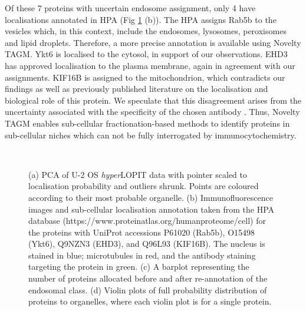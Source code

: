 \documentclass[12pt,english]{article}
\begin{document}
Of these 7 proteins with uncertain endosome assignment, only 4 have localisations annotated in HPA (Fig \ref{figure:u2os} (b)). The HPA assigns Rab5b to the vesicles  which, in this context, include the endosomes, lysosomes, peroxisomes and lipid droplets. Therefore, a more precise annotation is available using Novelty TAGM. Ykt6 is localised to the cytosol, in support of our observations. EHD3 has approved localisation to the plasma membrane, again in agreement with our assignments. KIF16B is assigned to the mitochondrion, which contradicts our findings as well as previously published literature on the localisation and biological role of this protein. We speculate that this disagreement arises from the uncertainty associated with the specificity of the chosen antibody \citep{Thul:2017}. Thus, Novelty TAGM enables sub-cellular fractionation-based methods to identify proteins in sub-cellular niches which can not be fully interrogated by immunocytochemistry.

\begin{figure}[h]
	\begin{subfigure}[t]{0.3\textwidth}
		\centering
		\caption{}
	\end{subfigure}
	\begin{subfigure}[t]{0.3\textwidth}
	\centering
	\caption{}
	\end{subfigure}
	\begin{subfigure}[t]{0.3\textwidth}
	\centering
	\caption{}
	\end{subfigure}
	~
	\begin{subfigure}[t]{1\textwidth}
		\centering
		\caption{}
	\end{subfigure}
	\caption{(a) PCA of U-2 OS \textit{hyper}LOPIT data with pointer scaled to localisation probability and outliers shrunk. Points are coloured according to their most probable organelle. (b) Immunofluorescence images and sub-cellular localisation annotation taken from the HPA database (https://www.proteinatlas.org/humanproteome/cell) for the proteins with UniProt accessions P61020 (Rab5b), O15498 (Ykt6), Q9NZN3 (EHD3), and Q96L93 (KIF16B). The nucleus is stained in blue; microtubules in red, and the antibody staining targeting the protein in green. (c) A barplot representing the number of proteins allocated before and after re-annotation of the endosomal class. (d) Violin plots of full probability distribution of proteins to organelles, where each violin plot is for a single protein.
	}
	\label{figure:u2os}
\end{figure}
\clearpage 
\end{document}
